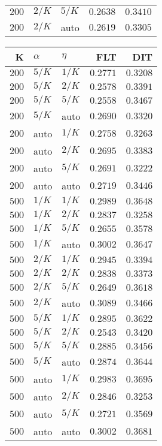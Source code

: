 \begin{table}
\begin{spacing}{1.2}
{\begin{tabular}{rll|rr}
$200$ &  $2/K$ &  $5/K$ &         $0.2638$ & $0.3410$ \\
$200$ &  $2/K$ &   auto &         $0.2619$ & $0.3305$ \\
\bottomrule
\end{tabular}
} \hfill \parbox{.45\linewidth}{\centering \begin{tabular}{rll|rr}
\toprule
    K &  $\alpha$ &    $\eta$ & FLT &        DIT \\
\midrule
$200$ &  $5/K$ &  $1/K$ &         $0.2771$ &      $0.3208$ \\
$200$ &  $5/K$ &  $2/K$ &         $0.2578$ &      $0.3391$ \\
$200$ &  $5/K$ &  $5/K$ &         $0.2558$ &      $0.3467$ \\
$200$ &  $5/K$ &   auto &         $0.2690$ &      $0.3320$ \\
$200$ &   auto &  $1/K$ &         $0.2758$ &      $0.3263$ \\
$200$ &   auto &  $2/K$ &         $0.2695$ &      $0.3383$ \\
$200$ &   auto &  $5/K$ &         $0.2691$ &      $0.3222$ \\
$200$ &   auto &   auto &         $0.2719$ &      $0.3446$ \\
\myrowcolor $500$ &  $1/K$ &  $1/K$ &         $0.2989$ &      $0.3648$ \\
$500$ &  $1/K$ &  $2/K$ &         $0.2837$ &      $0.3258$ \\
$500$ &  $1/K$ &  $5/K$ &         $0.2655$ &      $0.3578$ \\
$500$ &  $1/K$ &   auto &         $0.3002$ &      $0.3647$ \\
$500$ &  $2/K$ &  $1/K$ &         $0.2945$ &      $0.3394$ \\
$500$ &  $2/K$ &  $2/K$ &         $0.2838$ &      $0.3373$ \\
$500$ &  $2/K$ &  $5/K$ &         $0.2649$ &      $0.3618$ \\
$500$ &  $2/K$ &   auto &    $\bm{0.3089}$ &      $0.3466$ \\
$500$ &  $5/K$ &  $1/K$ &         $0.2895$ &      $0.3622$ \\
$500$ &  $5/K$ &  $2/K$ &         $0.2543$ &      $0.3420$ \\
$500$ &  $5/K$ &  $5/K$ &         $0.2885$ &      $0.3456$ \\
$500$ &  $5/K$ &   auto &         $0.2874$ &      $0.3644$ \\
$500$ &   auto &  $1/K$ &         $0.2983$ & $\bm{0.3695}$ \\
$500$ &   auto &  $2/K$ &         $0.2846$ &      $0.3253$ \\
$500$ &   auto &  $5/K$ &         $0.2721$ &      $0.3569$ \\
$500$ &   auto &   auto &         $0.3002$ &      $0.3681$ \\
\bottomrule
\end{tabular}
}
\end{spacing}
\end{table}
